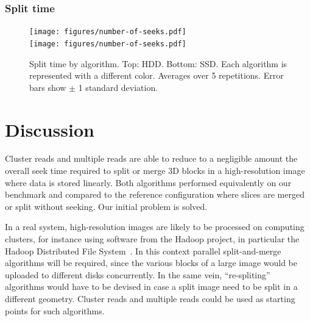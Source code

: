 \documentclass[10pt, conference, compsocconf]{IEEEtran}
\begin{document}
\subsubsection{Split time}



\begin{figure}[h]
  \centering
  \texttt{[image: figures/number-of-seeks.pdf]}\\
  \texttt{[image: figures/number-of-seeks.pdf]}
  \hfill
  \caption{Split time by algorithm. Top: HDD. Bottom: SSD. Each
    algorithm is represented with a different color. Averages over 5
    repetitions. Error bars show $\pm$ 1 standard deviation. }
\label{fig:split-time}
\end{figure}

\section{Discussion}
\label{sec:discussion}

Cluster reads and multiple reads are able to reduce to a negligible
amount the overall seek time required to split or merge 3D blocks in a
high-resolution image where data is stored linearly. Both algorithms
performed equivalently on our benchmark and compared to the reference
configuration where slices are merged or split without seeking. Our
initial problem is solved.




In a real system, high-resolution images are likely to be processed on
computing clusters, for instance using software from the Hadoop
project, in particular the Hadoop Distributed File
System~\cite{shvachko2010hadoop}. In this context parallel split-and-merge algorithms
will be required, since the various blocks of a large image would be
uploaded to different disks concurrently. In the same vein,
``re-spliting'' algorithms would have to be devised in case a split
image need to be split in a different geometry. Cluster reads and
multiple reads could be used as starting points for such algorithms.
\end{document}
